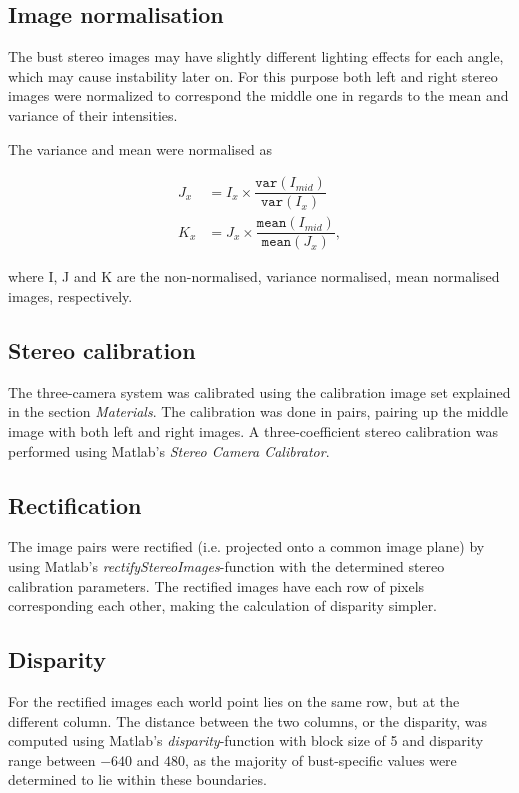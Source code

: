 \documentclass[journal]{IEEEtran}
\begin{document}
\subsection{Image normalisation}

The bust stereo images may have slightly different lighting effects for each angle, which may cause instability later on.
For this purpose both left and right stereo images were normalized to correspond the middle one in regards to the mean and variance of their intensities.

The variance and mean were normalised as 

\begin{align}
J_{x} &= I_{x} \times \dfrac{\texttt{var}(I_{mid})}{\texttt{var}(I_x)}\\
K_{x} &= J_{x} \times \dfrac{\texttt{mean}(I_{mid})}{\texttt{mean}(J_x)},
\end{align}

\noindent where I, J and K are the non-normalised, variance normalised, mean normalised images, respectively.


\subsection{Stereo calibration}

The three-camera system was calibrated using the calibration image set explained in the section \textit{Materials}. 
The calibration was done in pairs, pairing up the middle image with both left and right images.
A three-coefficient stereo calibration was performed using Matlab's \textit{Stereo Camera Calibrator}.


\subsection{Rectification}

The image pairs were rectified (i.e. projected onto a common image plane) by using Matlab's \textit{rectifyStereoImages}-function with the determined stereo calibration parameters.
The rectified images have each row of pixels corresponding each other, making the calculation of disparity simpler.


\subsection{Disparity}

For the rectified images each world point lies on the same row, but at the different column. 
The distance between the two columns, or the disparity, was computed using Matlab's \textit{disparity}-function with block size of 5 and disparity range between $ -640 $ and $ 480 $, as the majority of bust-specific values were determined to lie within these boundaries.  %
\end{document}
